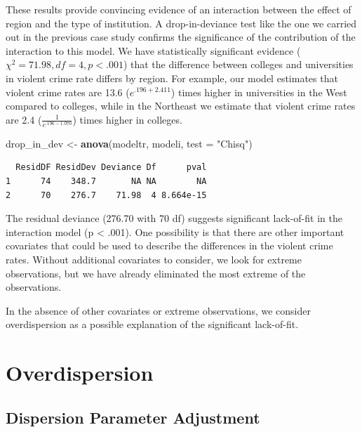 \documentclass[
]{krantz}
\newenvironment{Shaded}{\begin{snugshade}}{\end{snugshade}}
\newcommand{\DataTypeTok}[1]{\textcolor[rgb]{0.27,0.27,0.27}{#1}}
\newcommand{\KeywordTok}[1]{\textcolor[rgb]{0.27,0.27,0.27}{\textbf{#1}}}
\newcommand{\NormalTok}[1]{#1}
\newcommand{\StringTok}[1]{\textcolor[rgb]{0.5,0.5,0.5}{#1}}
\begin{document}
These results provide convincing evidence of an interaction between the effect of region and the type of institution. A drop-in-deviance test like the one we carried out in the previous case study confirms the significance of the contribution of the interaction to this model. We have statistically significant evidence (\(\chi^2=71.98, df=4, p<.001\)) that the difference between colleges and universities in violent crime rate differs by region. For example, our model estimates that violent crime rates are 13.6 (\(e^{.196+2.411}\)) times higher in universities in the West compared to colleges, while in the Northeast we estimate that violent crime rates are 2.4 (\(\frac{1}{e^{.196-1.070}}\)) times higher in colleges.

\begin{Shaded}
\begin{Highlighting}[]
\NormalTok{drop_in_dev <-}\StringTok{ }\KeywordTok{anova}\NormalTok{(modeltr, modeli, }\DataTypeTok{test =} \StringTok{"Chisq"}\NormalTok{)}
\end{Highlighting}
\end{Shaded}

\begin{verbatim}
  ResidDF ResidDev Deviance Df      pval
1      74    348.7       NA NA        NA
2      70    276.7    71.98  4 8.664e-15
\end{verbatim}

The residual deviance (276.70 with 70 df) suggests significant lack-of-fit in the interaction model (p \textless{} .001). One possibility is that there are other important covariates that could be used to describe the differences in the violent crime rates. Without additional covariates to consider, we look for extreme observations, but we have already eliminated the most extreme of the observations.

In the absence of other covariates or extreme observations, we consider overdispersion as a possible explanation of the significant lack-of-fit.

\hypertarget{sec-overdispPois}{%
\section{Overdispersion}\label{sec-overdispPois}}

\hypertarget{dispersion-parameter-adjustment}{%
\subsection{Dispersion Parameter Adjustment}\label{dispersion-parameter-adjustment}}
\end{document}
